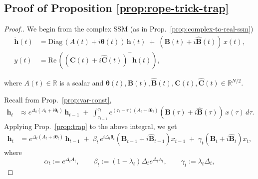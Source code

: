 \documentclass{article}
\def\vh{{\bm{h}}}
\def\bB{{\bm{B}}}
\def\bC{{\bm{C}}}
\theoremstyle{plain}
\theoremstyle{definition}
\theoremstyle{remark}
\begin{document}
\subsection{Proof of Proposition \ref{prop:rope-trick-trap}}
\label{app:proof-rope-trick-trap}
\PropRoPETrickTrap*
\begin{proof}[Proof.]
We begin from the complex SSM (as in Prop.~\ref{prop:complex-to-real-ssm})
\begin{align*}
    \dot{\vh}(t)
    &= \mathrm{Diag}\,\left(A(t)+i\boldsymbol{\theta}(t)\right)\,\vh(t)
      \;+\;\left(\bB(t)+i\hat{\bB}(t)\right)\,x(t),\\
    y(t)
    &= \mathrm{Re}\,\left((\bC(t)+i\hat{\bC}(t))^\top \vh(t)\right),
\end{align*}

where $A(t)\in\mathbb{R}$ is a scalar and $\boldsymbol{\theta}(t),\bB(t),\hat{\bB}(t),\bC(t),\hat{\bC}(t)\in\mathbb{R}^{N/2}$.

\medskip
Recall from Prop.~\ref{prop:var-const},
\begin{align*}
\vh_t
&\approx e^{\Delta_t(A_t+i\boldsymbol{\theta}_t)}\,\vh_{t-1}
\;+\; \int_{\tau_{t-1}}^{\tau_t}
      e^{(\tau_t-\tau)(A_t+i\boldsymbol{\theta}_t)}
      \left(\bB(\tau)+i\hat{\bB}(\tau)\right)\,x(\tau)\,d\tau.
\end{align*}
Applying Prop.~\ref{prop:trap} to the above integral, we get 
\begin{align}
\label{eq:trap-complex}
\vh_t
&= e^{\Delta_t(A_t+i\boldsymbol{\theta}_t)}\,\vh_{t-1}
  \;+\; \beta_t\,e^{i\Delta_t\boldsymbol{\theta}_t}\left(\bB_{t-1}+i\hat{\bB}_{t-1}\right)x_{t-1}
  \;+\; \gamma_t\left(\bB_t+i\hat{\bB}_t\right)x_t,
\end{align}
where
\[
\alpha_t:=e^{\Delta_t A_t},\qquad
\beta_t:=(1-\lambda_t)\Delta_t e^{\Delta_t A_t},\qquad
\gamma_t:=\lambda_t\Delta_t,
\]


\end{proof}
\end{document}
